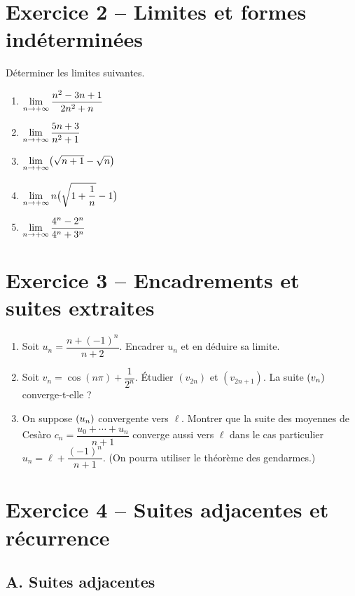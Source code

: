 \documentclass[11pt,a4paper]{article}
\begin{document}
\section*{Exercice 2 -- Limites et formes indéterminées}

Déterminer les limites suivantes.

\begin{enumerate}
  \item $\displaystyle\lim_{n\to +\infty} \dfrac{n^2 - 3n + 1}{2n^2 + n}$
  \item $\displaystyle\lim_{n\to +\infty} \dfrac{5n+3}{n^2 + 1}$
  \item $\displaystyle\lim_{n\to +\infty} \bigl(\sqrt{n+1}-\sqrt{n}\bigr)$
  \item $\displaystyle\lim_{n\to +\infty} n\bigl(\sqrt{1+\dfrac{1}{n}} - 1\bigr)$
  \item $\displaystyle\lim_{n\to +\infty} \dfrac{4^n - 2^n}{4^n + 3^n}$
\end{enumerate}

\section*{Exercice 3 -- Encadrements et suites extraites}

\begin{enumerate}
  \item Soit $u_n = \dfrac{n + (-1)^n}{n+2}$. Encadrer $u_n$ et en déduire sa limite.
  \item Soit $v_n = \cos(n\pi) + \dfrac{1}{2^n}$. Étudier $(v_{2n})$ et $(v_{2n+1})$. La suite $(v_n)$ converge-t-elle ?
  \item On suppose $(u_n)$ convergente vers $\ell$. Montrer que la suite des moyennes de Cesàro $c_n = \dfrac{u_0+\cdots+u_n}{n+1}$ converge aussi vers $\ell$ dans le cas particulier $u_n = \ell + \dfrac{(-1)^n}{n+1}$. (On pourra utiliser le théorème des gendarmes.)
\end{enumerate}

\section*{Exercice 4 -- Suites adjacentes et récurrence}

\subsection*{A. Suites adjacentes}
\end{document}
